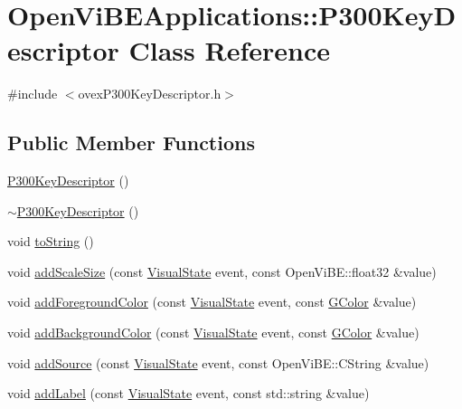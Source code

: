 \hypertarget{classOpenViBEApplications_1_1P300KeyDescriptor}{
\section{OpenViBEApplications::P300KeyDescriptor Class Reference}
\label{classOpenViBEApplications_1_1P300KeyDescriptor}
}


{\ttfamily \#include $<$ovexP300KeyDescriptor.h$>$}

\subsection*{Public Member Functions}
\begin{DoxyCompactItemize}
\item 
\hyperlink{classOpenViBEApplications_1_1P300KeyDescriptor_a49dcd052802ecda6eace363bd09bb20e}{P300KeyDescriptor} ()
\item 
\hyperlink{classOpenViBEApplications_1_1P300KeyDescriptor_a33977d67836d53cb4757f963bb18f9e0}{$\sim$P300KeyDescriptor} ()
\item 
void \hyperlink{classOpenViBEApplications_1_1P300KeyDescriptor_afe5a19ffb107428aec3f47e4e0009cb9}{toString} ()
\item 
void \hyperlink{classOpenViBEApplications_1_1P300KeyDescriptor_af3fd953acb0a555e7c121484415fa600}{addScaleSize} (const \hyperlink{ova__defines_8h_ac2575a0c79ceb4592555fa66f173dfc8}{VisualState} event, const OpenViBE::float32 \&value)
\item 
void \hyperlink{classOpenViBEApplications_1_1P300KeyDescriptor_ad0d325cc72abae9ed44e4ff74982d43b}{addForegroundColor} (const \hyperlink{ova__defines_8h_ac2575a0c79ceb4592555fa66f173dfc8}{VisualState} event, const \hyperlink{structOpenViBEApplications_1_1GColor}{GColor} \&value)
\item 
void \hyperlink{classOpenViBEApplications_1_1P300KeyDescriptor_a3deb015e1db35ac13d8564cc0761bbd9}{addBackgroundColor} (const \hyperlink{ova__defines_8h_ac2575a0c79ceb4592555fa66f173dfc8}{VisualState} event, const \hyperlink{structOpenViBEApplications_1_1GColor}{GColor} \&value)
\item 
void \hyperlink{classOpenViBEApplications_1_1P300KeyDescriptor_a4c421931f1968c6856e8eb10e7e291d3}{addSource} (const \hyperlink{ova__defines_8h_ac2575a0c79ceb4592555fa66f173dfc8}{VisualState} event, const OpenViBE::CString \&value)
\item 
void \hyperlink{classOpenViBEApplications_1_1P300KeyDescriptor_a8c8f146a76b5218d94d241c497717921}{addLabel} (const \hyperlink{ova__defines_8h_ac2575a0c79ceb4592555fa66f173dfc8}{VisualState} event, const std::string \&value)

\end{DoxyCompactItemize}
